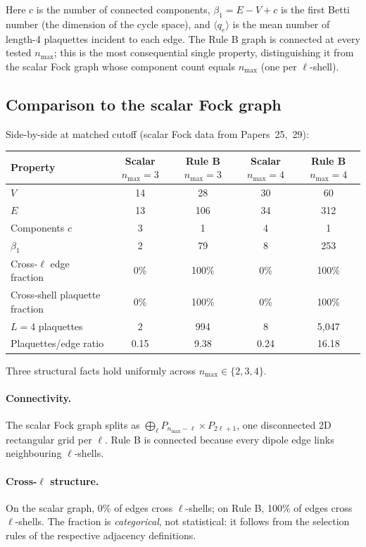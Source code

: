 \documentclass[11pt]{article}
\begin{document}
Here $c$ is the number of connected components, $\beta_1=E-V+c$ is the first
Betti number (the dimension of the cycle space), and $\langle q_e\rangle$ is the
mean number of length-4 plaquettes incident to each edge. The Rule B graph is
connected at every tested $n_\text{max}$; this is the most consequential single
property, distinguishing it from the scalar Fock graph whose component count
equals $n_\text{max}$ (one per $\ell$-shell).

\subsection{Comparison to the scalar Fock graph}
\label{sec:scalar_compare}

Side-by-side at matched cutoff (scalar Fock data from Papers~25,~29):

\begin{center}
\begin{tabular}{lcccc}
\toprule
Property & Scalar $n_\text{max}=3$ & Rule B $n_\text{max}=3$ &
  Scalar $n_\text{max}=4$ & Rule B $n_\text{max}=4$ \\
\midrule
$V$            & 14 & 28  & 30 & 60  \\
$E$            & 13 & 106 & 34 & 312 \\
Components $c$ & 3  & 1   & 4  & 1   \\
$\beta_1$      & 2  & 79  & 8  & 253 \\
Cross-$\ell$ edge fraction & 0\% & 100\% & 0\% & 100\% \\
Cross-shell plaquette fraction & 0\% & 100\% & 0\% & 100\% \\
$L=4$ plaquettes & 2 & 994 & 8 & 5{,}047 \\
Plaquettes/edge ratio & 0.15 & 9.38 & 0.24 & 16.18 \\
\bottomrule
\end{tabular}
\end{center}

Three structural facts hold uniformly across $n_\text{max}\in\{2,3,4\}$.

\paragraph{Connectivity.} The scalar Fock graph splits as
$\bigoplus_\ell P_{n_\text{max}-\ell}\times P_{2\ell+1}$, one disconnected 2D
rectangular grid per $\ell$. Rule B is connected because every dipole edge
links neighbouring $\ell$-shells.

\paragraph{Cross-$\ell$ structure.} On the scalar graph, 0\% of edges cross
$\ell$-shells; on Rule B, 100\% of edges cross $\ell$-shells. The fraction is
\emph{categorical}, not statistical: it follows from the selection rules of the
respective adjacency definitions.
\end{document}
